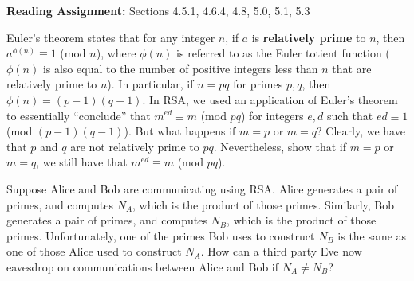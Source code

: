 \documentclass[12pt,twoside]{article}
\begin{document}
\noindent \textbf{Reading Assignment:}   Sections 4.5.1, 4.6.4, 4.8, 5.0, 5.1, 5.3
\\

\begin{problem}{15}
Euler's theorem states that for any integer $n$, if $a$ is \textbf{relatively prime} to $n$, then $a^{\phi(n)} \equiv 1$ (mod $n$), where $\phi(n)$ is referred to as the Euler totient function ($\phi(n)$ is also equal to the number of positive integers less than $n$ that are relatively prime to $n$).  In particular, if $n = pq$ for primes $p, q$, then $\phi(n) = (p-1)(q-1)$.   
\bparts
{}  In RSA, we used an application of Euler's theorem to essentially ``conclude'' that $m^{ed} \equiv  m$ (mod $pq$) for integers $e, d$ such that $ed \equiv 1$ (mod $(p-1)(q-1)$). But what happens if $m = p$ or $m = q$?  Clearly, we have that $p$ and $q$ are not relatively prime to $pq$.  Nevertheless, show that if $m = p$ or $m = q$, we still have that $m^{ed} \equiv m$ (mod $pq$).


 Suppose Alice and Bob are communicating using RSA.  Alice generates a pair of primes, and computes $N_A$, which is the product of those primes.  Similarly, Bob generates a pair of primes, and computes $N_B$, which is the product of those primes.  Unfortunately, one of the primes Bob uses to construct $N_B$ is the same as one of those Alice used to construct $N_A$.  How can a third party Eve now eavesdrop on communications between Alice and Bob if $N_A \neq N_B$?
\eparts
\end{problem}
\end{document}
